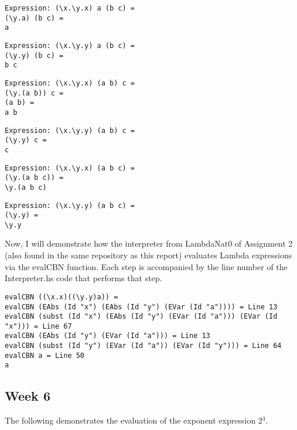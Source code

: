 \documentclass{article}
\theoremstyle{theorem}
\theoremstyle{definition}
\theoremstyle{remark}
\begin{document}
\begin{lstlisting}
Expression: (\x.\y.x) a (b c) =
(\y.a) (b c) =
a
\end{lstlisting}

\begin{lstlisting}
Expression: (\x.\y.y) a (b c) =
(\y.y) (b c) =
b c
\end{lstlisting}

\begin{lstlisting}
Expression: (\x.\y.x) (a b) c =
(\y.(a b)) c =
(a b) =
a b
\end{lstlisting}

\begin{lstlisting}
Expression: (\x.\y.y) (a b) c =
(\y.y) c =
c
\end{lstlisting}

\begin{lstlisting}
Expression: (\x.\y.x) (a b c) =
(\y.(a b c)) =
\y.(a b c)
\end{lstlisting}

\begin{lstlisting}
Expression: (\x.\y.y) (a b c) =
(\y.y) =
\y.y
\end{lstlisting}
%
Now, I will demonstrate how the interpreter from LambdaNat0 of Assignment 2 (also found in the same repository as this report) evaluates Lambda expressions via the evalCBN function. Each step is accompanied by the line number of the Interpreter.hs code that performs that step.

\begin{lstlisting}
evalCBN ((\x.x)((\y.y)a)) = 
evalCBN (EAbs (Id "x") (EAbs (Id "y") (EVar (Id "a")))) = Line 13
evalCBN (subst (Id "x") (EAbs (Id "y") (EVar (Id "a"))) (EVar (Id "x"))) = Line 67
evalCBN (EAbs (Id "y") (EVar (Id "a"))) = Line 13
evalCBN (subst (Id "y") (EVar (Id "a")) (EVar (Id "y"))) = Line 64
evalCBN a = Line 50
a
\end{lstlisting}

\subsection{Week 6}

The following demonstrates the evaluation of the exponent expression 2$^3$.
\end{document}
